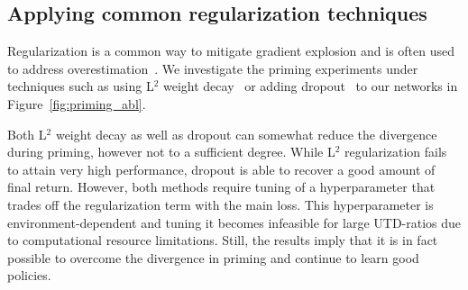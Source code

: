 
\subsection{Applying common regularization techniques} \label{sec:regularization}

Regularization is a common way to mitigate gradient explosion and is  often used to address overestimation~\parencite{farebrother2018generalization, chen2021randomized, liu2021regularization, hiraoka2022dropout, li2023efficient}. We investigate the priming experiments under techniques such as using L$^2$ weight decay~\parencite{krogh1991simple} or adding dropout~\parencite{srivastava14dropout} to our networks in Figure~\ref{fig:priming_abl}.

Both L$^2$ weight decay as well as dropout can somewhat reduce the divergence during priming, however not to a sufficient degree.
While L$^2$ regularization fails to attain very high performance, dropout is able to recover a good amount of final return.
However, both methods require tuning of a hyperparameter that trades off the regularization term with the main loss.
This hyperparameter is environment-dependent and tuning it becomes infeasible for large UTD-ratios due to computational resource limitations. 
Still, the results imply that it is in fact possible to overcome the divergence in priming and continue to learn good policies.



